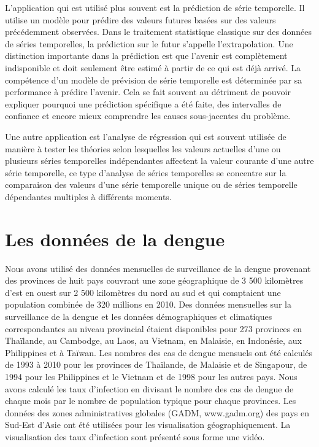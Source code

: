 L'application qui est utilisé plus souvent est la prédiction de série temporelle. Il utilise un modèle pour prédire des valeurs futures basées sur des valeurs précédemment observées. Dans le traitement statistique classique sur des données de séries temporelles, la prédiction sur le futur s'appelle l'extrapolation. Une distinction importante dans la prédiction est que l'avenir est complètement indisponible et doit seulement être estimé à partir de ce qui est déjà arrivé. La compétence d'un modèle de prévision de série temporelle est déterminée par sa performance à prédire l'avenir. Cela se fait souvent au détriment de pouvoir expliquer pourquoi une prédiction spécifique a été faite, des intervalles de confiance et encore mieux comprendre les causes sous-jacentes du problème.

Une autre application est l'analyse de régression qui est souvent utilisée de manière à tester les théories selon lesquelles les valeurs actuelles d'une ou plusieurs séries temporelles indépendantes affectent la valeur courante d'une autre série temporelle, ce type d'analyse de séries temporelles se concentre sur la comparaison des valeurs d'une série temporelle unique ou de séries temporelle dépendantes multiples à différents moments.

\section{Les donn\'ees de la dengue}
Nous avons utilisé des données mensuelles de surveillance de la dengue provenant des provinces de huit pays couvrant une zone géographique de 3 500 kilomètres d'est en ouest sur 2 500 kilomètres du nord au sud et qui comptaient une population combinée de 320 millions en 2010. Des données mensuelles sur la surveillance de la dengue et les données démographiques et climatiques correspondantes au niveau provincial étaient disponibles pour 273 provinces en Thaïlande, au Cambodge, au Laos, au Vietnam, en Malaisie, en Indonésie, aux Philippines et à Taïwan. Les nombres des cas de dengue mensuels  ont été calculés de 1993 à 2010 pour les provinces de Thaïlande, de Malaisie et de Singapour, de 1994 pour les Philippines et le Vietnam et de 1998 pour les autres pays\cite{van2015}. Nous avons calculé les taux d'infection en divisant le nombre des cas de dengue de chaque mois par le nombre de population typique pour chaque provinces.  Les données des zones administratives globales (GADM, www.gadm.org) des pays en Sud-Est d'Asie ont été utilisées pour les visualisation géographiquement. La visualisation des taux d'infection sont présenté sous forme une vidéo. 

